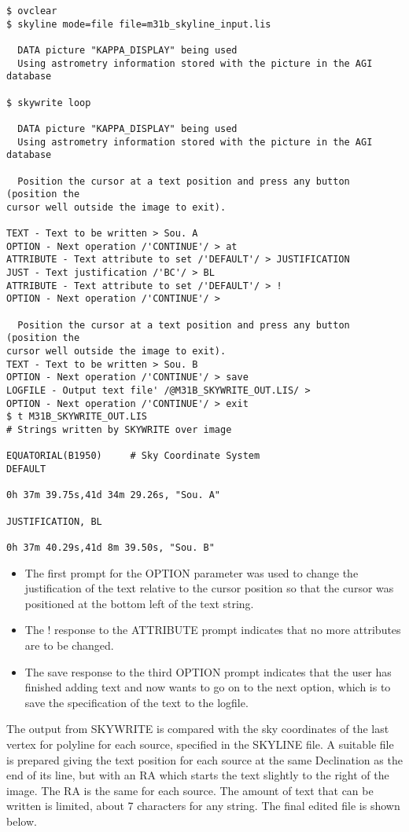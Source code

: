 \begin{small}
\begin{verbatim}
$ ovclear
$ skyline mode=file file=m31b_skyline_input.lis

  DATA picture "KAPPA_DISPLAY" being used
  Using astrometry information stored with the picture in the AGI database

$ skywrite loop 

  DATA picture "KAPPA_DISPLAY" being used
  Using astrometry information stored with the picture in the AGI database

  Position the cursor at a text position and press any button (position the
cursor well outside the image to exit).

TEXT - Text to be written > Sou. A
OPTION - Next operation /'CONTINUE'/ > at
ATTRIBUTE - Text attribute to set /'DEFAULT'/ > JUSTIFICATION
JUST - Text justification /'BC'/ > BL
ATTRIBUTE - Text attribute to set /'DEFAULT'/ > !
OPTION - Next operation /'CONTINUE'/ > 

  Position the cursor at a text position and press any button (position the
cursor well outside the image to exit).
TEXT - Text to be written > Sou. B
OPTION - Next operation /'CONTINUE'/ > save
LOGFILE - Output text file' /@M31B_SKYWRITE_OUT.LIS/ > 
OPTION - Next operation /'CONTINUE'/ > exit
$ t M31B_SKYWRITE_OUT.LIS
# Strings written by SKYWRITE over image
 
EQUATORIAL(B1950)     # Sky Coordinate System
DEFAULT
 
0h 37m 39.75s,41d 34m 29.26s, "Sou. A"
 
JUSTIFICATION, BL
 
0h 37m 40.29s,41d 8m 39.50s, "Sou. B"
\end{verbatim}
\end{small}
\begin{itemize}
\item The first prompt for the OPTION parameter was used to change the
justification of the text relative to the cursor position so that the cursor
was positioned at the bottom left of the text string.
\item The ! response to the ATTRIBUTE prompt indicates that no more attributes
are to be changed.
\item The save response to the third OPTION prompt indicates that the user has
finished adding text and now wants to go on to the next option, which is to save
the specification of the text to the logfile.
\end{itemize}
The output from SKYWRITE is compared with the sky coordinates of the last
vertex for polyline for each source, specified in the SKYLINE file. A suitable
file is prepared giving the text position for each source at the same
Declination as the end of its line, but with an RA which starts the text
slightly to the right of the image. The RA is the same for each source. The
amount of text that can be written is limited, about 7  characters for any
string. The final edited file is shown below.

